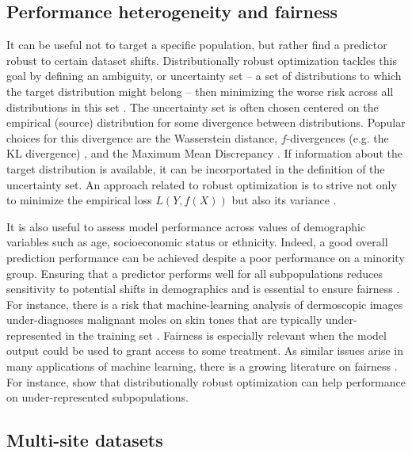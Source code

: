 \documentclass[a4paper,num-refs]{oup-contemporary}
\newcommand{\eg}{e.g.\,}
\begin{document}
\subsection{Performance heterogeneity and fairness}

It can be useful not to target a specific population, but rather
find a predictor robust to certain dataset shifts.
%
Distributionally robust optimization tackles this goal by
defining an ambiguity, or uncertainty set -- a set of distributions to which the target distribution might belong -- then minimizing the worse risk across all distributions in this set \citep[see][for a review]{rahimian2019distributionally}.
%
The uncertainty set is often chosen centered on the empirical (source) distribution for some divergence between distributions.
%
Popular choices for this divergence are the Wasserstein distance, \(f\)-divergences (e.g. the KL divergence) \citep{duchi2018learning}, and the Maximum Mean Discrepancy \citep{zhu2020kernel}.
%
If information about the target distribution is available, it can be incorportated in the definition of the uncertainty set.
%
An approach related to robust optimization is to strive not only to minimize
the empirical loss \(L(Y, f(X))\) but also its variance
\cite{maurer2009empirical,namkoong2017variance}.

%
It is also useful to assess model performance across values of demographic
variables such as age, socioeconomic status or ethnicity. Indeed,
a good overall prediction performance can be achieved despite a poor
performance on a minority group. 
Ensuring that a
predictor performs well for all subpopulations reduces sensitivity to potential
shifts in demographics and is essential to ensure fairness
\citep{abbasi2020risk}.
%
For instance, there is a risk that machine-learning analysis of dermoscopic images under-diagnoses malignant moles on skin tones that are typically under-represented in the training set \cite{adamson2018machine}.
%
Fairness is especially relevant when the model output could be used to grant
access to some treatment.
%
As similar issues arise in many applications of
machine learning, there is a growing literature on fairness
\citep[see \eg][for an overview]{barocas-hardt-narayanan}.
%
For instance, 
\citet{duchi2018learning} show that distributionally robust optimization can
help performance on under-represented subpopulations.

\subsection{Multi-site datasets}
\end{document}
